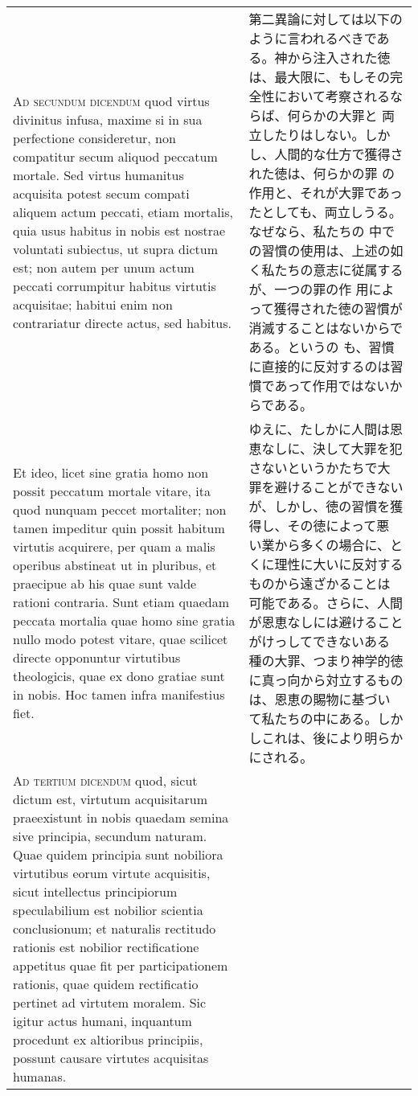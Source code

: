 \documentclass[10pt]{jsarticle}
\begin{document}
\begin{longtable}{p{21em}p{21em}}
 {\scshape Ad secundum dicendum} quod virtus divinitus infusa, maxime
 si in sua perfectione consideretur, non compatitur secum aliquod
 peccatum mortale. Sed virtus humanitus acquisita potest secum compati
 aliquem actum peccati, etiam mortalis, quia usus habitus in nobis est
 nostrae voluntati subiectus, ut supra dictum est; non autem per unum
 actum peccati corrumpitur habitus virtutis acquisitae; habitui enim
 non contrariatur directe actus, sed habitus.

&

 第二異論に対しては以下のように言われるべきである。神から注入された徳
 は、最大限に、もしその完全性において考察されるならば、何らかの大罪と
 両立したりはしない。しかし、人間的な仕方で獲得された徳は、何らかの罪
 の作用と、それが大罪であったとしても、両立しうる。なぜなら、私たちの
 中での習慣の使用は、上述の如く私たちの意志に従属するが、一つの罪の作
 用によって獲得された徳の習慣が消滅することはないからである。というの
 も、習慣に直接的に反対するのは習慣であって作用ではないからである。
 
\\



 Et ideo, licet sine gratia homo non possit peccatum mortale vitare,
 ita quod nunquam peccet mortaliter; non tamen impeditur quin possit
 habitum virtutis acquirere, per quam a malis operibus abstineat ut in
 pluribus, et praecipue ab his quae sunt valde rationi contraria. Sunt
 etiam quaedam peccata mortalia quae homo sine gratia nullo modo
 potest vitare, quae scilicet directe opponuntur virtutibus
 theologicis, quae ex dono gratiae sunt in nobis. Hoc tamen infra
 manifestius fiet.


&

ゆえに、たしかに人間は恩恵なしに、決して大罪を犯さないというかたちで大
罪を避けることができないが、しかし、徳の習慣を獲得し、その徳によって悪
い業から多くの場合に、とくに理性に大いに反対するものから遠ざかることは
可能である。さらに、人間が恩恵なしには避けることがけっしてできないある
種の大罪、つまり神学的徳に真っ向から対立するものは、恩恵の賜物に基づい
て私たちの中にある。しかしこれは、後により明らかにされる。
 
\\



{\scshape Ad tertium dicendum} quod, sicut dictum est, virtutum
acquisitarum praeexistunt in nobis quaedam semina sive principia,
secundum naturam. Quae quidem principia sunt nobiliora virtutibus
eorum virtute acquisitis, sicut intellectus principiorum speculabilium
est nobilior scientia conclusionum; et naturalis rectitudo rationis
est nobilior rectificatione appetitus quae fit per participationem
rationis, quae quidem rectificatio pertinet ad virtutem moralem. Sic
igitur actus humani, inquantum procedunt ex altioribus principiis,
possunt causare virtutes acquisitas humanas.



\end{longtable}
\end{document}

